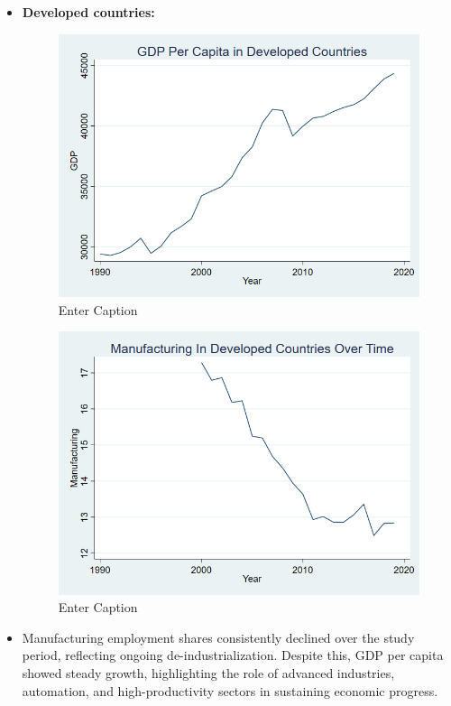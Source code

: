 \documentclass[12pt]{article}
\begin{document}
\begin{itemize}
\item \textbf{Developed countries:} 
\begin{figure}
    \centering
    \includegraphics[width=0.5\linewidth]{FINAL FINAL GDP DEVELOPED.png}
    \caption{Enter Caption}
    \label{fig:enter-label}
\end{figure}
\begin{figure}
    \centering
    \includegraphics[width=0.5\linewidth]{FINAL FINAL MANU DEVELOPED.png}
    \caption{Enter Caption}
    \label{fig:enter-label}
\end{figure}

\item Manufacturing employment shares consistently declined over the study period, reflecting ongoing de-industrialization. Despite this, GDP per capita showed steady growth, highlighting the role of advanced industries, automation, and high-productivity sectors in sustaining economic progress.
\end{itemize}
\end{document}
